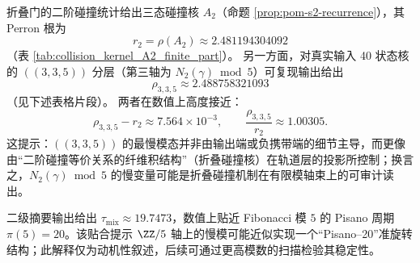 \begin{remark}[慢模与折叠碰撞核的同源性信号]\label{rem:arity-335-rho-close-to-a2}\label{rem:arity-335-r2-vs-rho}
折叠门的二阶碰撞统计给出三态碰撞核 \(A_2\)（命题 \ref{prop:pom-s2-recurrence}），其 Perron 根为
$$
r_2=\rho(A_2)\approx 2.481194304092
$$
（表 \ref{tab:collision_kernel_A2_finite_part}）。
另一方面，对真实输入 40 状态核的 \(((3,3,5))\) 分层（第三轴为 \(N_2(\gamma)\bmod 5\)）可复现输出给出
$$
\rho_{3,3,5}\approx 2.488758321093
$$
（见下述表格片段）。
两者在数值上高度接近：
$$
\rho_{3,3,5}-r_2\approx 7.564\times 10^{-3},
\qquad
\frac{\rho_{3,3,5}}{r_2}\approx 1.00305.
$$
这提示：\(((3,3,5))\) 的最慢模态并非由输出端或负携带端的细节主导，而更像由“二阶碰撞等价关系的纤维积结构”（折叠碰撞核）在轨道层的投影所控制；换言之，\(N_2(\gamma)\bmod 5\) 的慢变量可能是折叠碰撞机制在有限模轴束上的可审计读出。
\end{remark}

\begin{remark}\label{rem:arity-335-pisano}
二级摘要输出给出
\(
\tau_{\mathrm{mix}}\approx 19.7473
\)，数值上贴近 Fibonacci 模 $5$ 的 Pisano 周期 $\pi(5)=20$。该贴合提示 $\ZZ/5$ 轴上的慢模可能近似实现一个“Pisano--20”准旋转结构；此解释仅为动机性叙述，后续可通过更高模数的扫描检验其稳定性。
\end{remark}

